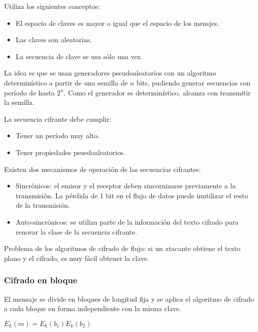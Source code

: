 Utiliza los siguientes conceptos:
\begin{itemize}
	\item El espacio de claves es mayor o igual que el espacio de los mensjes.
	\item Las claves son aleatorias.
	\item La secuencia de clave se usa sólo una vez.
\end{itemize}

La idea es que se usan generadores pseudoaleatorios con un algoritmo determinístico a partir de una semilla de $n$ bits, pudiendo generar secuencias con período de hasta $2^n$. Como el generador es determinístico, alcanza con transmitir la semilla. 

La secuencia cifrante debe cumplir:
\begin{itemize}
	\item Tener un período muy alto.
	\item Tener propiedades psuedoaleatorios.
\end{itemize}

Existen dos mecanismos de operación de las secuencias cifrantes:
\begin{itemize}
	\item Sincrónicos: el emisor y el receptor deben sincornizarse previamente a la transmisión. La pérdida de 1 bit en el flujo de datos puede inutilizar el resto de la transmisión.
	\item Auto-sincrónicos: se utiliza parte de la información del texto cifrado para renovar la clase de la secuencia cifrante.
\end{itemize}



Problema de los algoritmos de cifrado de flujo: si un atacante obtiene el texto plano y el cifrado, es muy fácil obtener la clave.
 
\subsubsection{Cifrado en bloque}
El mensaje se divide en bloques de longitud fija y se aplica el algoritmo de cifrado a cada bloque en forma independiente con la misma clave.

\begin{center}
	$E_k(m) = E_k(b_1)E_k(b_2)$
\end{center}

